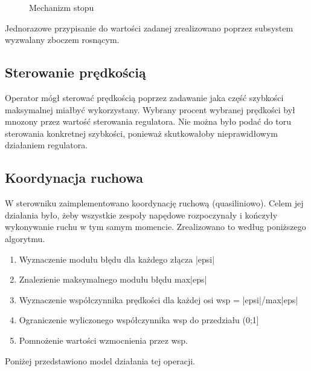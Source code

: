 \begin{figure}
\centering
{}
\quad
{}
\caption{Mechanizm stopu}
\label{fig:mechanizm_stopu}
\end{figure}

Jednorazowe przypisanie do wartości zadanej zrealizowano poprzez subsystem wyzwalany zboczem rosnącym.

\subsection{Sterowanie prędkością}
\label{subsec:sterowaniePredkoscia}

Operator mógł sterować prędkością poprzez zadawanie jaka część szybkości maksymalnej miałbyć wykorzystany. Wybrany procent wybranej prędkości był mnozony przez wartość sterowania regulatora. Nie można było podać do toru sterowania konkretnej szybkości, ponieważ skutkowałoby nieprawidłowym działaniem regulatora.

\subsection{Koordynacja ruchowa}
\label{subsec:koordynacjaRuchowa}

W sterowniku zaimplementowano koordynację ruchową (quasiliniowo). Celem jej działania było, żeby wszystkie zespoły napędowe rozpoczynały i kończyły wykonywanie ruchu w tym samym momencie. Zrealizowano to według poniższego algorytmu.
\begin{enumerate}
\item Wyznaczenie modułu błędu dla każdego złącza |epsi|
\item Znalezienie maksymalnego modułu błędu max|eps|
\item Wyznaczenie współczynnika prędkości dla każdej osi wsp = |epsi|/max|eps|
\item Ograniczenie wyliczonego współczynnika wsp do przedziału (0;1] 
\item Pomnożenie wartości wzmocnienia przez wsp.
\end{enumerate}
Poniżej przedstawiono model działania tej operacji.

